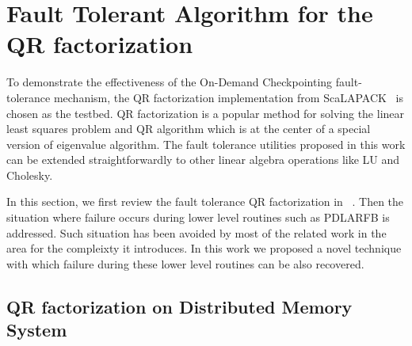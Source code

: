 \section{Fault Tolerant Algorithm for the QR factorization}
\label{sec:ftla}

To demonstrate the effectiveness of the On-Demand Checkpointing
fault-tolerance mechanism, the QR factorization implementation from
ScaLAPACK~\cite{dongarra1997scalapack} is chosen as the testbed.  QR
factorization is a popular method for solving the linear least squares
problem and QR algorithm which is at the center of a special version
of eigenvalue algorithm. The fault tolerance utilities proposed in
this work can be extended straightforwardly to other linear algebra
operations like LU and Cholesky.

In this section, we first review the fault tolerance QR factorization in ~\cite{lawn253}.
Then the situation where failure occurs during 
lower level routines such as PDLARFB is addressed. Such situation has been
avoided by most of the related work in the area for the compleixty it introduces.
In this work we proposed a novel technique with which failure during 
these lower level routines can be also recovered. 

\subsection{QR factorization on Distributed Memory System}

